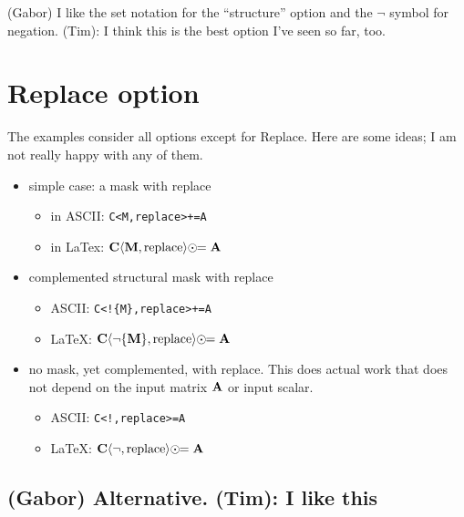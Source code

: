 \documentclass[11pt]{article}
\begin{document}
(Gabor) I like the set notation for the ``structure'' option and the $\neg$
symbol for negation.  (Tim): I think this is the best option I've seen so far,
too.

\newpage

\section{Replace option}

The examples consider all options except for Replace.
Here are some ideas; I am not really happy with any of them.

\begin{itemize}

\item simple case: a mask with replace

    \begin{itemize}
    \item[] in ASCII: \verb'C<M,replace>+=A'
    \item[] in LaTex: $\bf C \langle M, \mbox{replace} \rangle \odot\!\!= A $
    \end{itemize}

\item complemented structural mask with replace

    \begin{itemize}
    \item[] ASCII: \verb'C<!{M},replace>+=A'
    \item[] LaTeX: ${\bf C} \langle \neg \{{\bf M}\}, \mbox{replace}
    \rangle \odot\!\!= {\bf A}$
    \end{itemize}

\item no mask, yet complemented, with replace.  This does actual work that
does not depend on the input matrix $\bf A$ or input scalar.

    \begin{itemize}
    \item[] ASCII: \verb'C<!,replace>=A'
    \item[] LaTeX: ${\bf C} \langle \neg, \mbox{replace}
    \rangle \odot\!\!= {\bf A}$
    \end{itemize}

\end{itemize}

\subsection{(Gabor) Alternative. (Tim): I like this}
\end{document}
